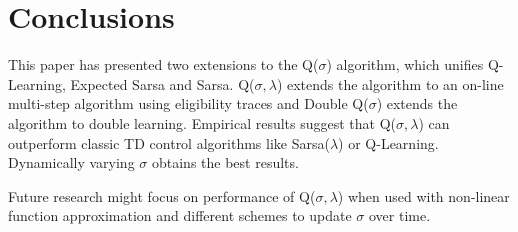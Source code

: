 \documentclass{article} %
\begin{document}
\section{Conclusions}

This paper has presented two extensions to the Q($\sigma$) algorithm, which unifies Q-Learning, Expected Sarsa and Sarsa. Q($\sigma, \lambda$) extends the algorithm to an on-line multi-step algorithm using eligibility traces and Double Q($\sigma$) extends the algorithm to double learning.
Empirical results suggest that Q($\sigma, \lambda$) can outperform classic TD control algorithms like Sarsa($\lambda$) or Q-Learning. Dynamically varying $\sigma$ obtains the best results.

Future research might focus on performance of Q($\sigma, \lambda$) when used with non-linear function approximation and different schemes to update $\sigma$ over time.


\end{document}
